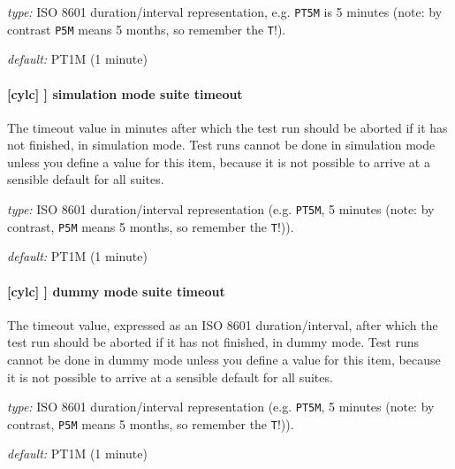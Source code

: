 \begin{myitemize}
    \item {\em type:} ISO 8601 duration/interval representation, e.g.
        \lstinline=PT5M= is 5 minutes (note: by contrast \lstinline=P5M= means 5
         months, so remember the \lstinline=T=!).
    \item {\em default:} PT1M (1 minute)
\end{myitemize}

\paragraph[simulation mode suite timeout]{[cylc] \textrightarrow [[reference test]] \textrightarrow simulation mode suite timeout}

The timeout value in minutes after which the test run should be aborted
if it has not finished, in simulation mode. Test runs cannot be done in
simulation mode unless you define a value for this item, because it is
not possible to arrive at a sensible default for all suites.

\begin{myitemize}
    \item {\em type:} ISO 8601 duration/interval representation (e.g.
 \lstinline=PT5M=, 5 minutes (note: by contrast, \lstinline=P5M= means 5
 months, so remember the \lstinline=T=!)).
    \item {\em default:} PT1M (1 minute)
\end{myitemize}

\paragraph[dummy mode suite timeout]{[cylc] \textrightarrow [[reference test]] \textrightarrow dummy mode suite timeout}

The timeout value, expressed as an ISO 8601 duration/interval, after which the
test run should be aborted if it has not finished, in dummy mode.  Test runs
cannot be done in dummy mode unless you define a value for this item, because
it is not possible to arrive at a sensible default for all suites.

\begin{myitemize}
    \item {\em type:} ISO 8601 duration/interval representation (e.g.
 \lstinline=PT5M=, 5 minutes (note: by contrast, \lstinline=P5M= means 5
 months, so remember the \lstinline=T=!)).
    \item {\em default:} PT1M (1 minute)
\end{myitemize}

